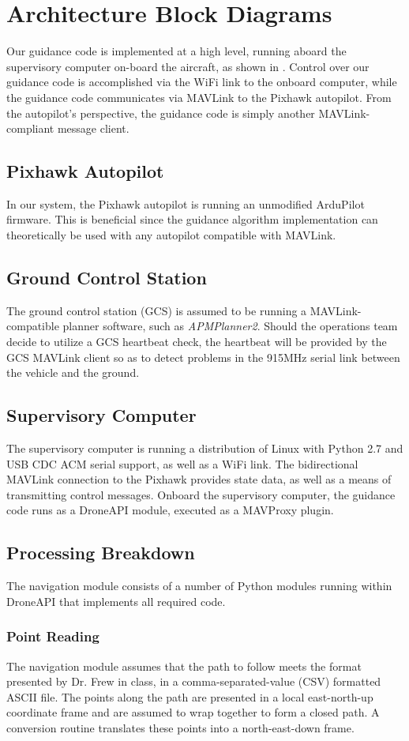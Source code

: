 \documentclass{aiaa}
\begin{document}
\section{Architecture Block Diagrams}
Our guidance code is implemented at a high level, running aboard the supervisory computer on-board the aircraft, as shown in . Control over our guidance code is accomplished via the WiFi link to the onboard computer, while the guidance code communicates via MAVLink to the Pixhawk autopilot. From the autopilot's perspective, the guidance code is simply another MAVLink-compliant message client. 
\subsection{Pixhawk Autopilot}
In our system, the Pixhawk autopilot is running an unmodified ArduPilot firmware. This is beneficial since the guidance algorithm implementation can theoretically be used with any autopilot compatible with MAVLink.
\subsection{Ground Control Station}
The ground control station (GCS) is assumed to be running a MAVLink-compatible planner software, such as \textit{APMPlanner2}. Should the operations team decide to utilize a GCS heartbeat check, the heartbeat will be provided by the GCS MAVLink client so as to detect problems in the 915MHz serial link between the vehicle and the ground. 
\subsection{Supervisory Computer}
The supervisory computer is running a distribution of Linux with Python 2.7 and USB CDC ACM serial support, as well as a WiFi link. The bidirectional MAVLink connection to the Pixhawk provides state data, as well as a means of transmitting control messages. Onboard the supervisory computer, the guidance code runs as a DroneAPI module, executed as a MAVProxy plugin.

\subsection{Processing Breakdown}
The navigation module consists of a number of Python modules running within DroneAPI that implements all required code. 
\subsubsection{Point Reading}
The navigation module assumes that the path to follow meets the format presented by Dr. Frew in class, in a comma-separated-value (CSV) formatted ASCII file. The points along the path are presented in a local east-north-up coordinate frame and are assumed to wrap together to form a closed path. A conversion routine translates these points into a north-east-down frame.
\end{document}
